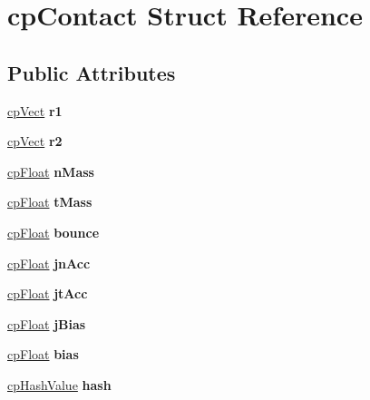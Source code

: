 \hypertarget{structcp_contact}{}\section{cp\+Contact Struct Reference}
\label{structcp_contact}
\subsection*{Public Attributes}
\begin{DoxyCompactItemize}
\item 
\mbox{\label{structcp_contact_a30ea3ddb5c7b028cd1ce5d2ee92ac301}} 
\mbox{\hyperlink{structcp_vect}{cp\+Vect}} {\bfseries r1}
\item 
\mbox{\label{structcp_contact_a07adb5206473f2fc05b4344abde787cd}} 
\mbox{\hyperlink{structcp_vect}{cp\+Vect}} {\bfseries r2}
\item 
\mbox{\label{structcp_contact_ac5d0505328b0068f47eee7927268f69e}} 
\mbox{\hyperlink{group__basic_types_gac1ed65573e035bf892505768c852d8d3}{cp\+Float}} {\bfseries n\+Mass}
\item 
\mbox{\label{structcp_contact_a0ad3ef72cf8b1063953c8539a24a0559}} 
\mbox{\hyperlink{group__basic_types_gac1ed65573e035bf892505768c852d8d3}{cp\+Float}} {\bfseries t\+Mass}
\item 
\mbox{\label{structcp_contact_a2d3afaf4917fc1f240b145ba4792a65d}} 
\mbox{\hyperlink{group__basic_types_gac1ed65573e035bf892505768c852d8d3}{cp\+Float}} {\bfseries bounce}
\item 
\mbox{\label{structcp_contact_ab6e608723226293fed10834a1e79215c}} 
\mbox{\hyperlink{group__basic_types_gac1ed65573e035bf892505768c852d8d3}{cp\+Float}} {\bfseries jn\+Acc}
\item 
\mbox{\label{structcp_contact_a45337f7a21dc55faf402f87465d7bd5c}} 
\mbox{\hyperlink{group__basic_types_gac1ed65573e035bf892505768c852d8d3}{cp\+Float}} {\bfseries jt\+Acc}
\item 
\mbox{\label{structcp_contact_a0a626c4ba591d693e88eceb737b22d80}} 
\mbox{\hyperlink{group__basic_types_gac1ed65573e035bf892505768c852d8d3}{cp\+Float}} {\bfseries j\+Bias}
\item 
\mbox{\label{structcp_contact_ae7f4f699739f54df581effb936ffe766}} 
\mbox{\hyperlink{group__basic_types_gac1ed65573e035bf892505768c852d8d3}{cp\+Float}} {\bfseries bias}
\item 
\mbox{\label{structcp_contact_a1ecf53c870da47cdedfb9340b774ee08}} 
\mbox{\hyperlink{group__basic_types_gae7eb4775a9f43914a15553ca65a048f4}{cp\+Hash\+Value}} {\bfseries hash}
\end{DoxyCompactItemize}



